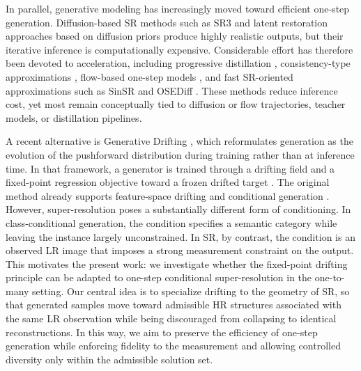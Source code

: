 \documentclass{article}
\begin{document}
In parallel, generative modeling has increasingly moved toward efficient one-step generation. Diffusion-based SR methods such as SR3 \cite{saharia2021sr3} and latent restoration approaches based on diffusion priors \cite{rombach2022latent} produce highly realistic outputs, but their iterative inference is computationally expensive. Considerable effort has therefore been devoted to acceleration, including progressive distillation \cite{salimans2022progressive}, consistency-type approximations \cite{song2023consistency}, flow-based one-step models \cite{lipman2023flowmatching,geng2025meanflows}, and fast SR-oriented approximations such as SinSR \cite{wang2024sinsr} and OSEDiff \cite{wu2024osediff}. These methods reduce inference cost, yet most remain conceptually tied to diffusion or flow trajectories, teacher models, or distillation pipelines.

A recent alternative is Generative Drifting \cite{deng2026drifting}, which reformulates generation as the evolution of the pushforward distribution during training rather than at inference time. In that framework, a generator is trained through a drifting field and a fixed-point regression objective toward a frozen drifted target \cite{deng2026drifting}. The original method already supports feature-space drifting and conditional generation \cite{deng2026drifting}. However, super-resolution poses a substantially different form of conditioning. In class-conditional generation, the condition specifies a semantic category while leaving the instance largely unconstrained. In SR, by contrast, the condition is an observed LR image that imposes a strong measurement constraint on the output. This motivates the present work: we investigate whether the fixed-point drifting principle can be adapted to one-step conditional super-resolution in the one-to-many setting. Our central idea is to specialize drifting to the geometry of SR, so that generated samples move toward admissible HR structures associated with the same LR observation while being discouraged from collapsing to identical reconstructions. In this way, we aim to preserve the efficiency of one-step generation while enforcing fidelity to the measurement and allowing controlled diversity only within the admissible solution set.
\end{document}
